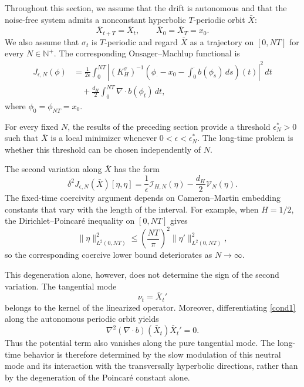 \documentclass[preprint,12pt]{elsarticle}
\theoremstyle{definition}
\theoremstyle{plain}
\begin{document}
Throughout this section, we assume that the drift is autonomous and
that the noise-free system admits a nonconstant hyperbolic
$T$-periodic orbit $\bar X$:
\begin{equation*}
    \bar X_{t+T}=\bar X_t,
    \qquad
    \bar X_0=\bar X_T=x_0.
\end{equation*}
We also assume that $\sigma_t$ is $T$-periodic and regard $\bar X$ as
a trajectory on $[0,NT]$ for every $N\in\mathbb N^+$. The
corresponding Onsager--Machlup functional is
\begin{equation}
\label{eq:om functional longtime}
\begin{aligned}
    J_{\epsilon,N}(\phi)
    &=
    \frac{1}{2\epsilon}
    \int_0^{NT}
    \left|
        (K_H^\sigma)^{-1}
        \left(
            \phi_\cdot-x_0
            -
            \int_0^\cdot b(\phi_s)\,ds
        \right)(t)
    \right|^2\,dt
    \\
    &\quad+
    \frac{d_H}{2}
    \int_0^{NT}
    \nabla\!\cdot b(\phi_t)\,dt,
\end{aligned}
\end{equation}
where $\phi_0=\phi_{NT}=x_0$.

For every fixed $N$, the results of the preceding section provide a
threshold $\epsilon_N^*>0$ such that $\bar X$ is a local minimizer
whenever $0<\epsilon<\epsilon_N^*$. The long-time problem is whether
this threshold can be chosen independently of $N$.

The second variation along $\bar X$ has the form
\begin{equation*}
    \delta^2J_{\epsilon,N}(\bar X)[\eta,\eta]
    =
    \frac{1}{\epsilon}\mathcal I_{H,N}(\eta)
    -
    \frac{d_H}{2}\mathcal V_N(\eta).
\end{equation*}
The fixed-time coercivity argument depends on Cameron--Martin
embedding constants that vary with the length of the interval. For
example, when $H=1/2$, the Dirichlet--Poincar\'e inequality on
$[0,NT]$ gives
\begin{equation*}
    \|\eta\|_{L^2(0,NT)}^2
    \leq
    \left(\frac{NT}{\pi}\right)^2
    \|\eta'\|_{L^2(0,NT)}^2,
\end{equation*}
so the corresponding coercive lower bound deteriorates as
$N\to\infty$.

This degeneration alone, however, does not determine the sign of the
second variation. The tangential mode
\begin{equation*}
    \nu_t=\bar X_t'
\end{equation*}
belongs to the kernel of the linearized operator. Moreover,
differentiating \eqref{cond1} along the autonomous periodic orbit
yields
\begin{equation}
\label{eq:tangent-direct}
    \nabla^2(\nabla\!\cdot b)(\bar X_t)\bar X_t'=0.
\end{equation}
Thus the potential term also vanishes along the pure tangential mode.
The long-time behavior is therefore determined by the slow modulation
of this neutral mode and its interaction with the transversally
hyperbolic directions, rather than by the degeneration of the
Poincar\'e constant alone.
\end{document}
